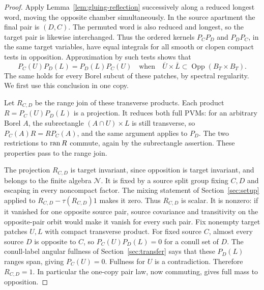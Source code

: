 \begin{proof}
Apply Lemma~\ref{lem:gluing-reflection} successively
along a reduced longest word, moving the opposite
chamber simultaneously.  In the source apartment
the final pair is $(D,C)$.  The permuted word is
also reduced and longest, so the target pair is
likewise interchanged.  Thus the ordered kernels
$P_CP_D$ and $P_DP_C$, in the same target variables,
have equal integrals for all smooth or clopen compact
tests in opposition.  Approximation by such tests
shows that
\[
 P_C(U)P_D(L)=P_D(L)P_C(U)
 \quad\text{when}\quad
 \overline U\times\overline L
       \subset\operatorname{Opp}(B_T\times B_T).
\]
The same holds for every Borel subcut of these
patches, by spectral regularity.  We first use
this conclusion in one copy.

Let $R_{C,D}$ be the range join of these transverse
products.  Each product $R=P_C(U)P_D(L)$ is a
projection.  It reduces both full PVMs: for an
arbitrary Borel $A$, the subrectangle
$(A\cap U)\times L$ is still transverse, so
$P_C(A)R=RP_C(A)$, and the same argument applies
to $P_D$.  The two restrictions to $\operatorname{ran} R$
commute, again by the subrectangle assertion.
These properties pass to the range join.

The projection $R_{C,D}$ is target invariant,
since opposition is target invariant, and belongs
to the finite algebra $\mathcal N$.  It is fixed
by a source split group fixing $C,D$ and escaping
in every noncompact factor.  The mixing statement
of Section~\ref{sec:setup} applied to
$R_{C,D}-\tau(R_{C,D})1$ makes it zero.  Thus
$R_{C,D}$ is scalar.  It is nonzero: if it vanished
for one opposite source pair, source covariance
and transitivity on the opposite-pair orbit would
make it vanish for every such pair.  Fix nonempty
target patches $U,L$ with compact transverse
product.  For fixed source $C$, almost every
source $D$ is opposite to $C$, so
$P_C(U)P_D(L)=0$ for a conull set of $D$.
The conull-label angular fullness of
Section~\ref{sec:transfer} says that these
$P_D(L)$ ranges span, giving $P_C(U)=0$.
Fullness for $U$ is a contradiction.  Therefore
$R_{C,D}=1$.  In particular the one-copy pair
law, now commuting, gives full mass to opposition.


\end{proof}
